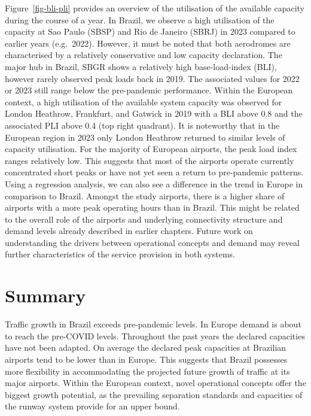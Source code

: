 \documentclass[
  a4paper,
  DIV=11,
  numbers=noendperiod]{scrreport}
\begin{document}
Figure~\ref{fig-bli-pli} provides an overview of the utilisation of the
available capacity during the course of a year. In Brazil, we observe a
high utilisation of the capacity at Sao Paulo (SBSP) and Rio de Janeiro
(SBRJ) in 2023 compared to earlier years (e.g.~2022). However, it must
be noted that both aerodromes are characterised by a relatively
conservative and low capacity declaration. The major hub in Brazil, SBGR
shows a relatively high base-load-index (BLI), however rarely observed
peak loads back in 2019. The associated values for 2022 or 2023 still
range below the pre-pandemic performance. Within the European context, a
high utilisation of the available system capacity was observed for
London Heathrow, Frankfurt, and Gatwick in 2019 with a BLI above 0.8 and
the associated PLI above 0.4 (top right quadrant). It is noteworthy that
in the European region in 2023 only London Heathrow returned to similar
levels of capacity utilisation. For the majority of European airports,
the peak load index ranges relatively low. This suggests that most of
the airports operate currently concentrated short peaks or have not yet
seen a return to pre-pandemic patterns. Using a regression analysis, we
can also see a difference in the trend in Europe in comparison to
Brazil. Amongst the study airports, there is a higher share of airports
with a more peak operating hours than in Brazil. This might be related
to the overall role of the airports and underlying connectivity
structure and demand levels already described in earlier chapters.
Future work on understanding the drivers between operational concepts
and demand may reveal further characteristics of the service provision
in both systems.

\hypertarget{summary-3}{%
\section{Summary}\label{summary-3}}

Traffic growth in Brazil exceeds pre-pandemic levels. In Europe demand
is about to reach the pre-COVID levels. Throughout the past years the
declared capacities have not been adapted. On average the declared peak
capacities at Brazilian airports tend to be lower than in Europe. This
suggests that Brazil possesses more flexibility in accommodating the
projected future growth of traffic at its major airports. Within the
European context, novel operational concepts offer the biggest growth
potential, as the prevailing separation standards and capacities of the
runway system provide for an upper bound.
\end{document}
